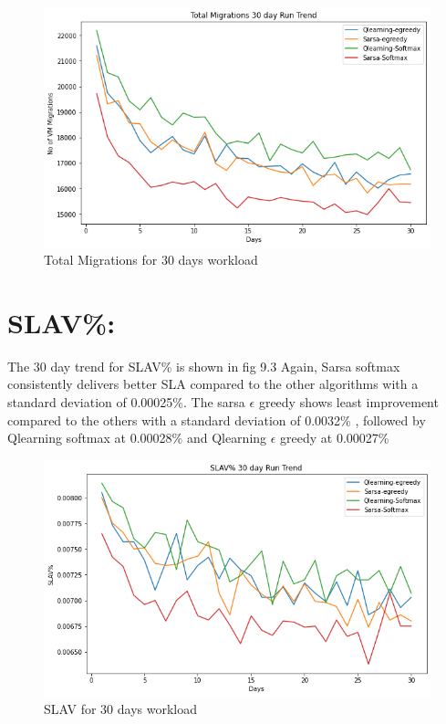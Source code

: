 \documentclass[a4paper,12pt]{Classes/RoboticsLaTeX}
\begin{document}
         \begin{figure}[H]
             \centering
             \includegraphics[width=1\linewidth]{Figures/Total_Migrations_Convergence.png}
             \caption{Total Migrations for 30 days workload}
             \label{fig:enter-label}
         \end{figure}

         \section{SLAV\%:}
          The 30 day trend for SLAV\%  is shown in fig 9.3 Again, Sarsa softmax consistently delivers  better SLA compared to the other algorithms  with a standard deviation of 0.00025\%. The sarsa $\epsilon$ greedy  shows least improvement compared to the others  with a standard deviation of 0.0032\% , followed by Qlearning softmax at 0.00028\% and Qlearning $\epsilon$ greedy at 0.00027\%
         
         \begin{figure}[H]
             \centering
             \includegraphics[width=1\linewidth]{Figures/SLAV_30day_Convergence.png}
             \caption{SLAV for 30 days workload}
             \label{fig:enter-label}
         \end{figure}
\end{document}
